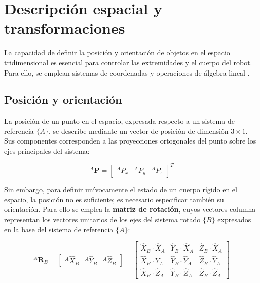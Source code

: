 \section{Descripción espacial y transformaciones}
\label{sec:descripcion_espacial}

La capacidad de definir la posición y orientación de objetos en el espacio tridimensional es esencial para controlar las extremidades y el cuerpo del robot. Para ello, se emplean sistemas de coordenadas y operaciones de álgebra lineal \cite{craig2018robotics,siciliano2016springer}.

\vspace{-0.5\baselineskip}
\subsection{Posición y orientación}

La posición de un punto en el espacio, expresada respecto a un sistema de referencia $\{A\}$, se describe mediante un vector de posición de dimensión $3\times1$. Sus componentes corresponden a las proyecciones ortogonales del punto sobre los ejes principales del sistema:

\vspace{-0.5\baselineskip}
\begin{equation}
    {}^A\bm{P} =
    \begin{bmatrix}
        {}^A P_x & {}^A P_y & {}^A P_z
    \end{bmatrix}^T
    \label{eq:vector_posicion}
\end{equation}
\vspace{-1.0\baselineskip}

Sin embargo, para definir unívocamente el estado de un cuerpo rígido en el espacio, la posición no es suficiente; es necesario especificar también su orientación. Para ello se emplea la \textbf{matriz de rotación}, cuyos vectores columna representan los vectores unitarios de los ejes del sistema rotado $\{B\}$ expresados en la base del sistema de referencia $\{A\}$:

\vspace{-0.5\baselineskip}
\begin{equation}
    {}^A\bm{R}_B = 
    \begin{bmatrix}
        {}^A\hat{X}_B & {}^A\hat{Y}_B & {}^A\hat{Z}_B
    \end{bmatrix}
    =
    \begin{bmatrix}
        \hat{X}_B \cdot \hat{X}_A & \hat{Y}_B \cdot \hat{X}_A & \hat{Z}_B \cdot \hat{X}_A \\
        \hat{X}_B \cdot \hat{Y}_A & \hat{Y}_B \cdot \hat{Y}_A & \hat{Z}_B \cdot \hat{Y}_A \\
        \hat{X}_B \cdot \hat{Z}_A & \hat{Y}_B \cdot \hat{Z}_A & \hat{Z}_B \cdot \hat{Z}_A
    \end{bmatrix}
    \label{eq:rij_productos_escalares}
\end{equation}
\vspace{-0.5\baselineskip}

